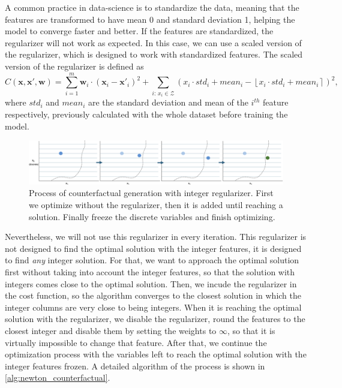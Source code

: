 \documentclass[12pt]{extarticle}
\numberwithin{equation}{section}
\begin{document}

A common practice in data-science is to standardize the data, meaning that the features are transformed to have mean 0 and standard deviation 1, helping the model to converge faster and better. If the features are standardized, the regularizer will not work as expected. In this case, we can use a scaled version of the regularizer, which is designed to work with standardized features. The scaled version of the regularizer is defined as
\begin{equation}\label{eq:cost_reg_scaled}
    C(\mathbf{x}, \mathbf{x}', \mathbf{w}) = \sum_{i=1}^{m} \mathbf{w}_i \cdot (\mathbf{x}_i - \mathbf{x}'_{i})^2 + \sum_{i:\, x_i\in \mathcal{Z}} (x_i \cdot std_i + mean_i - \left\lfloor x_i \cdot std_i + mean_i \right\rceil )^2,
\end{equation}
where \(std_i\) and \(mean_i\) are the standard deviation and mean of the \(i^{th}\) feature respectively, previously calculated with the whole dataset before training the model. 

\begin{figure}[H]
    \centering
    \includegraphics[width=1\textwidth]{images/discrete_process}
    \caption{Process of counterfactual generation with integer regularizer. First we optimize without the regularizer, then it is added until reaching a solution. Finally freeze the discrete variables and finish optimizing.}
\end{figure}

Nevertheless, we will not use this regularizer in every iteration. This regularizer is not designed to find the optimal solution with the integer features, it is designed to find \emph{any} integer solution. For that, we want to approach the optimal solution first without taking into account the integer features, so that the solution with integers comes close to the optimal solution. Then, we incude the regularizer in the cost function, so the algorithm converges to the closest solution in which the integer columns are very close to being integers. When it is reaching the optimal solution with the regularizer, we disable the regularizer, round the features to the closest integer and disable them by setting the weights to $\infty$, so that it is virtually impossible to change that feature. After that, we continue the optimization process with the variables left to reach the optimal solution with the integer features frozen. A detailed algorithm of the process is shown in \autoref{alg:newton_counterfactual}.
\end{document}
